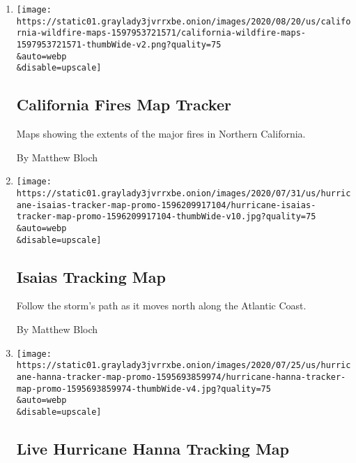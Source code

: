 \begin{enumerate}
\def\labelenumi{\arabic{enumi}.}
\item
  \href{/interactive/2020/08/20/us/california-wildfire-maps.html}{}

  \texttt{[image: https://static01.graylady3jvrrxbe.onion/images/2020/08/20/us/california-wildfire-maps-1597953721571/california-wildfire-maps-1597953721571-thumbWide-v2.png?quality=75\\\&auto=webp\\\&disable=upscale]}

  \hypertarget{california-fires-map-tracker}{%
  \subsection{California Fires Map
  Tracker}\label{california-fires-map-tracker}}

  Maps showing the extents of the major fires in Northern California.

  By Matthew Bloch
\item
  \href{/interactive/2020/07/31/us/hurricane-isaias-tracker-map.html}{}

  \texttt{[image: https://static01.graylady3jvrrxbe.onion/images/2020/07/31/us/hurricane-isaias-tracker-map-promo-1596209917104/hurricane-isaias-tracker-map-promo-1596209917104-thumbWide-v10.jpg?quality=75\\\&auto=webp\\\&disable=upscale]}

  \hypertarget{isaias-tracking-map}{%
  \subsection{Isaias Tracking Map}\label{isaias-tracking-map}}

  Follow the storm's path as it moves north along the Atlantic Coast.

  By Matthew Bloch
\item
  \href{/interactive/2020/07/25/us/hurricane-hanna-tracker-map.html}{}

  \texttt{[image: https://static01.graylady3jvrrxbe.onion/images/2020/07/25/us/hurricane-hanna-tracker-map-promo-1595693859974/hurricane-hanna-tracker-map-promo-1595693859974-thumbWide-v4.jpg?quality=75\\\&auto=webp\\\&disable=upscale]}

  \hypertarget{live-hurricane-hanna-tracking-map}{%
  \subsection{Live Hurricane Hanna Tracking
  Map}\label{live-hurricane-hanna-tracking-map}}


\end{enumerate}
